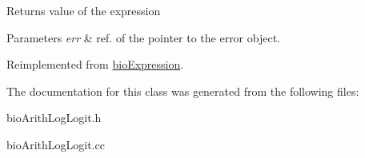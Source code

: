 \begin{DoxyReturn}{Returns}
value of the expression 
\end{DoxyReturn}

\begin{DoxyParams}{Parameters}
{\em err} & ref. of the pointer to the error object. \\
\hline
\end{DoxyParams}


Reimplemented from \hyperlink{classbio_expression_af58662a5d4d456f15bc4f2c9bd4f8a5b}{bio\+Expression}.



The documentation for this class was generated from the following files\+:\begin{DoxyCompactItemize}
\item 
bio\+Arith\+Log\+Logit.\+h\item 
bio\+Arith\+Log\+Logit.\+cc\end{DoxyCompactItemize}
